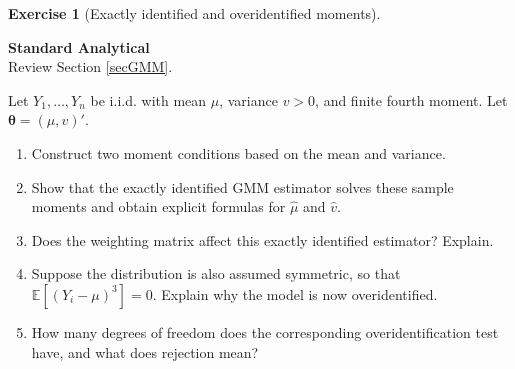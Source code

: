 \documentclass[
  11pt,
]{book}
\providecommand{\tightlist}{%
  \setlength{\itemsep}{0pt}\setlength{\parskip}{0pt}}
\theoremstyle{definition}
\theoremstyle{definition}
\theoremstyle{definition}
\newtheorem{exercise}{Exercise}[chapter]
\theoremstyle{definition}
\theoremstyle{remark}
\begin{document}

\begin{exercisebox}

\begin{exercise}[Exactly identified and overidentified moments]
\protect\hypertarget{exr:estimation-gmm-moments}{}\label{exr:estimation-gmm-moments}

\textbf{Standard \textbar{} Analytical}\\
Review Section \ref{secGMM}.

Let \(Y_1,\dots,Y_n\) be i.i.d. with mean \(\mu\), variance \(v>0\), and finite fourth moment. Let \(\boldsymbol\theta=(\mu,v)'\).

\begin{enumerate}
\def\labelenumi{\arabic{enumi}.}
\tightlist
\item
  Construct two moment conditions based on the mean and variance.
\item
  Show that the exactly identified GMM estimator solves these sample moments and obtain explicit formulas for \(\hat\mu\) and \(\hat v\).
\item
  Does the weighting matrix affect this exactly identified estimator? Explain.
\item
  Suppose the distribution is also assumed symmetric, so that \(\mathbb{E}[(Y_i-\mu)^3]=0\). Explain why the model is now overidentified.
\item
  How many degrees of freedom does the corresponding overidentification test have, and what does rejection mean?
\end{enumerate}

\end{exercise}

\end{exercisebox}

\end{document}
